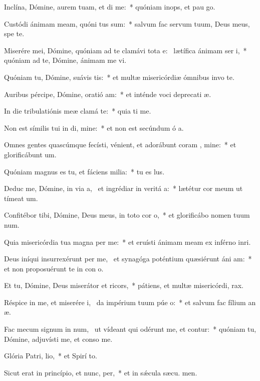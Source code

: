 \item Inclína, Dómine, aurem tuam, et di me:~* quóniam inops, et pau  go.
\item Custódi ánimam meam, quóni tus sum:~* salvum fac servum tuum, Deus meus, spe  te.
\item Miserére mei, Dómine, quóniam ad te clamávi tota e:~\pscross{} lætífica ánimam ser i,~* quóniam ad te, Dómine, ánimam me vi.
\item Quóniam tu, Dómine, suávis  tis:~* et multæ misericórdiæ ómnibus invo te.
\item Auribus pércipe, Dómine, oratió am:~* et inténde voci deprecati æ.
\item In die tribulatiónis meæ clamá  te:~* quia ti me.
\item Non est símilis tui in di, mine:~* et non est secúndum ó a.
\item Omnes gentes quascúmque fecísti, vénient, et adorábunt coram , mine:~* et glorificábunt  um.
\item Quóniam magnus es tu, et fáciens milia:~* tu es  lus.
\item Deduc me, Dómine, in via a,~\pscross{} et ingrédiar in veritá a:~* lætétur cor meum ut tímeat  um.
\item Confitébor tibi, Dómine, Deus meus, in toto cor o,~* et glorificábo nomen tuum  num.
\item Quia misericórdia tua magna  per me:~* et eruísti ánimam meam ex inférno inri.
\item Deus iníqui insurrexérunt per me,~\pscross{} et synagóga poténtium quæsiérunt áni am:~* et non proposuérunt te in con o.
\item Et tu, Dómine, Deus miserátor et ricors,~* pátiens, et multæ misericórdi,  rax.
\item Réspice in me, et miserére i,~\pscross{} da impérium tuum púe o:~* et salvum fac fílium an æ.
\item Fac mecum signum in num,~\pscross{} ut vídeant qui odérunt me, et contur:~* quóniam tu, Dómine, adjuvísti me, et conso  me.
\item Glória Patri,  lio,~* et Spirí to.
\item Sicut erat in princípio, et nunc,  per,~* et in sǽcula sæcu. men.
